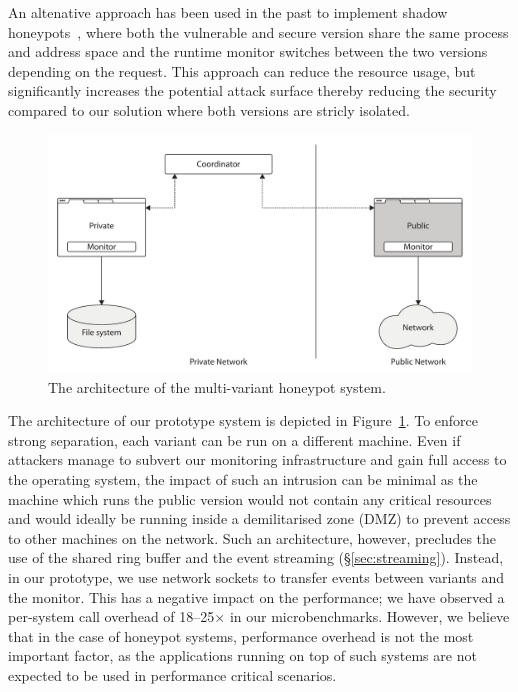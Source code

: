 An altenative approach has been used in the past to implement shadow
honeypots~\cite{shadow-honeypots}, where both the vulnerable and secure version
share the same process and address space and the runtime monitor switches
between the two versions depending on the request. This approach can reduce the
resource usage, but significantly increases the potential attack surface
thereby reducing the security compared to our solution where both versions are
stricly isolated.

\begin{figure}[t]
  \begin{center}
    \includegraphics[width=0.75\columnwidth]{applications/figures/honeypot}
    \caption{The architecture of the multi-variant honeypot system.}
    \label{fig:security-honeypot}
  \end{center}
\end{figure}

The architecture of our prototype system is depicted in
Figure~\ref{fig:security-honeypot}.  To enforce strong separation, each variant
can be run on a different machine. Even if attackers manage to subvert our
monitoring infrastructure and gain full access to the operating system, the
impact of such an intrusion can be minimal as the machine which runs the public
version would not contain any critical resources and would ideally be running
inside a demilitarised zone (DMZ) to prevent access to other machines on the
network.  Such an architecture, however, precludes the use of the shared ring
buffer and the event streaming (\S\ref{sec:streaming}). Instead, in our
prototype, we use network sockets to transfer events between variants and the
monitor. This has a negative impact on the performance; we have observed a
per-system call overhead of \numrange{18}{25}$\times$ in our microbenchmarks.
However, we believe that in the case of honeypot systems, performance overhead
is not the most important factor, as the applications running on top of such
systems are not expected to be used in performance critical scenarios.


